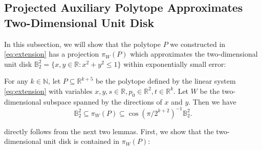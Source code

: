 \documentclass{theoretics}
\newcommand{\R}{\mathbb R}
\newcommand{\N}{\mathbb N}
\newcommand{\ball}{\mathbb{B}_2}
\renewcommand{\subset}{\subseteq}
\begin{document}
\subsection{Projected Auxiliary Polytope Approximates Two-Dimensional Unit Disk}\label{sec:lb-radius-proj}

In this subsection, we will show that the polytope $P$ we constructed in
\eqref{eq:extension} has a projection $\pi_W(P)$ which approximates
the two-dimensional unit disk $\ball^2 = \{x, y \in \R: x^2 + y^2 \leq 1\}$
within exponentially small error:

\begin{lemma}\label{lem:lb-radius-piwP}
For any $k \in \N$,
let $P \subset \R^{k+5}$ be the polytope defined by the linear system \eqref{eq:extension} with variables $x, y, s \in \R, p_0 \in \R^2, t \in \R^k$.
Let $W$ be the two-dimensional subspace spanned by the directions of $x$ and $y$. Then we have
\[
\ball^2 \subset \pi_W(P) \subset \cos(\pi/2^{k+2})^{-1}\ball^{2}.
\]
\end{lemma}


 directly follows from the next two lemmas.
First, we show that the two-dimensional unit disk is contained in $\pi_W(P)$:
\end{document}
